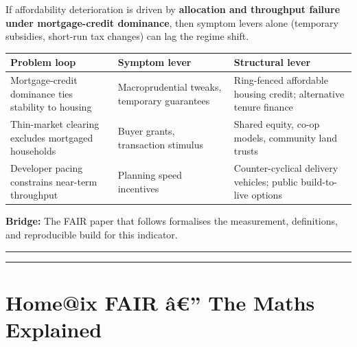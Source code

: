 If affordability deterioration is driven by \textbf{allocation and
throughput failure under mortgage-credit dominance}, then symptom levers
alone (temporary subsidies, short-run tax changes) can lag the regime
shift.

{\def\LTcaptype{none} %
\begin{longtable}[]{@{}
  >{\raggedright\arraybackslash}p{}
  >{\raggedright\arraybackslash}p{}
  >{\raggedright\arraybackslash}p{}@{}}
\toprule\noalign{}
\begin{minipage}[b]{\linewidth}\raggedright
Problem loop
\end{minipage} & \begin{minipage}[b]{\linewidth}\raggedright
Symptom lever
\end{minipage} & \begin{minipage}[b]{\linewidth}\raggedright
Structural lever
\end{minipage} \\
\midrule\noalign{}
\endhead
\bottomrule\noalign{}
\endlastfoot
Mortgage-credit dominance ties stability to housing & Macroprudential
tweaks, temporary guarantees & Ring-fenced affordable housing credit;
alternative tenure finance \\
Thin-market clearing excludes mortgaged households & Buyer grants,
transaction stimulus & Shared equity, co-op models, community land
trusts \\
Developer pacing constrains near-term throughput & Planning speed
incentives & Counter-cyclical delivery vehicles; public build-to-live
options \\
\end{longtable}
}

\textbf{Bridge:} The FAIR paper that follows formalises the measurement,
definitions, and reproducible build for this indicator.

\begin{center}\rule{0.5\linewidth}{0.5pt}\end{center}

\begin{center}\rule{0.5\linewidth}{0.5pt}\end{center}

\section{Home@ix FAIR â€'' The Maths
Explained}\label{homeix-fair-uxe2-the-maths-explained}

